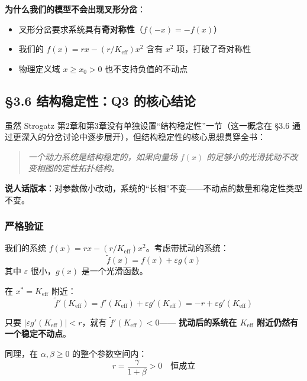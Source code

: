 \documentclass[12pt,a4paper]{article}
\begin{document}
\textbf{为什么我们的模型不会出现叉形分岔}：
\begin{itemize}
  \item 叉形分岔要求系统具有\textbf{奇对称性}（$f(-x) = -f(x)$）
  \item 我们的 $f(x) = r x - (r/K_{\text{eff}}) x^2$ 含有 $x^2$ 项，打破了奇对称性
  \item 物理定义域 $x \geq x_0 > 0$ 也不支持负值的不动点
\end{itemize}

\subsection{\S3.6 结构稳定性：Q3 的核心结论}

虽然 Strogatz 第2章和第3章没有单独设置``结构稳定性''一节（这一概念在 \S3.6
通过更深入的分岔讨论中逐步展开），但结构稳定性的核心思想贯穿全书：

\begin{quote}
\small
\textit{一个动力系统是结构稳定的，如果向量场 $f(x)$ 的足够小的光滑扰动不改变相图的定性拓扑结构。}
\end{quote}

\textbf{说人话版本}：对参数做小改动，系统的``长相''不变——不动点的数量和稳定性类型不变。

\subsubsection{严格验证}
我们的系统 $f(x) = r x - (r/K_{\text{eff}}) x^2$。考虑带扰动的系统：
\begin{equation}
\tilde{f}(x) = f(x) + \varepsilon g(x)
\end{equation}
其中 $\varepsilon$ 很小，$g(x)$ 是一个光滑函数。

在 $x^* = K_{\text{eff}}$ 附近：
\begin{equation}
\tilde{f}'(K_{\text{eff}}) = f'(K_{\text{eff}}) + \varepsilon g'(K_{\text{eff}})
                           = -r + \varepsilon g'(K_{\text{eff}})
\end{equation}

只要 $|\varepsilon g'(K_{\text{eff}})| < r$，就有 $\tilde{f}'(K_{\text{eff}}) < 0$——
\textbf{扰动后的系统在 $K_{\text{eff}}$ 附近仍然有一个稳定不动点}。

同理，在 $\alpha, \beta \geq 0$ 的整个参数空间内：
\begin{equation}
r = \frac{\gamma}{1+\beta} > 0 \quad \text{恒成立}
\end{equation}
\end{document}
